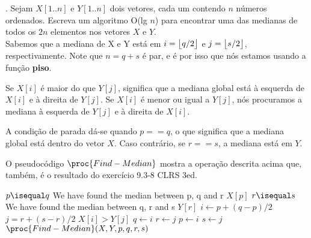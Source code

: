 
. Sejam $X[1..n]$ e $Y[1..n]$ dois vetores, cada um contendo $n$ números ordenados. Escreva um algoritmo O(lg $n$) para encontrar uma das medianas de todos os $2n$ elementos nos vetores $X$ e $Y$.\\[6pt]
Sabemos que a mediana de X e Y está em $i = \big\lfloor q / 2\big\rfloor$ e $j = \big\lfloor s / 2\big\rfloor$, respectivamente. Note que $n = q + s$ é par, e é por isso que nós estamos usando a função \textbf{piso}.

Se $X[i]$ é maior do que $Y[j]$, significa que a mediana global está à esquerda de $X[i]$ e à direita de $Y[j]$. Se $X[i]$ é menor ou igual a $Y[j]$, nós procuramos a mediana à esquerda de $Y[j]$ e à direita de $X[i]$.

A condição de parada dá-se quando $p == q$, o que significa que a mediana global está dentro do vetor $X$. Caso contrário, se $r == s$, a mediana está em $Y$.

O pseudocódigo $\proc{Find-Median}$ mostra a operação descrita acima que, também, é o resultado do exercício 9.3-8 CLRS 3ed.\\

\begin{codebox}
\li \If $p \isequal q$
\li \Comment We have found the median between p, q and r
\li     \Then
            \Return $X[p]$
\li     \ElseIf $r \isequal s$
\li \Comment We have found the median between q, r and s
\li     \Then
            \Return $Y[r]$
        \End
\li $i \gets p + (q - p) / 2$
\li $j = r + (s - r) / 2$
\li \If $X[i] > Y[j]$
\li     \Then
            $q \gets i$
\li         $r \gets j$
\li     \Else
\li         $p \gets i$
\li         $s \gets j$
        \End
\li \Return $\proc{Find-Median}(X, Y, p, q, r, s)$
\End
\end{codebox}